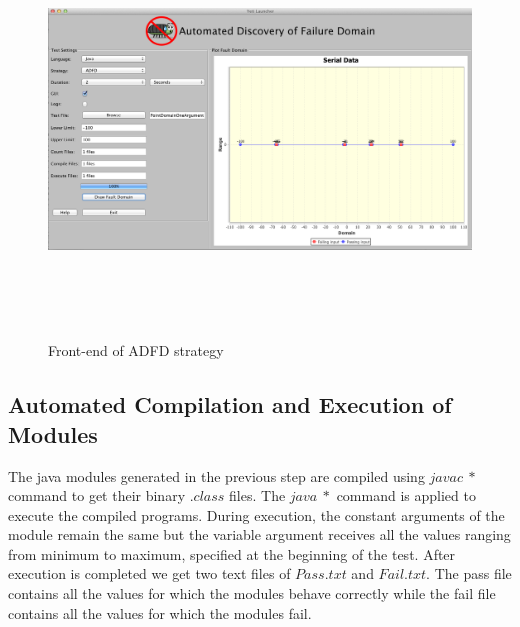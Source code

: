 \begin{figure}[H]
\begin{center}
\includegraphics[width=15cm,height=11cm]{chapter5/ADFD_front_end.png}
\bigskip
\caption{Front-end of ADFD strategy}
\label{fig:ADFD-frontend}
\end{center}
\end{figure}
\bigskip

\subsection{Automated Compilation and Execution of Modules}
The java modules generated in the previous step are compiled using $javac~*$ command to get their binary $.class$ files. The $java~*$ command is applied to execute the compiled programs. During execution, the constant arguments of the module remain the same but the variable argument receives all the values ranging from minimum to maximum, specified at the beginning of the test. After execution is completed we get two text files of $Pass.txt$ and $Fail.txt$. The pass file contains all the values for which the modules behave correctly while the fail file contains all the values for which the modules fail.

